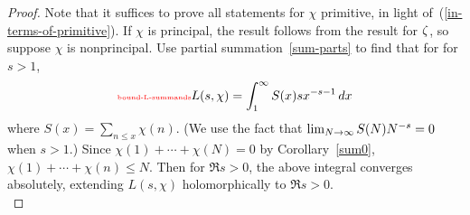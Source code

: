 \begin{proof}
%
Note that it suffices to prove all statements for $\chi$ primitive, in light of~(\ref{in-terms-of-primitive}). If $\chi$ is principal, the result follows from the result for $\zeta$, so suppose $\chi$ is nonprincipal. Use partial summation~\ref{sum-parts} to find that for for $s>1$,
\begin{equation}\llabel{bound-L-summands}
L(s,\chi)=\int_1^{\iy} S(x) sx^{-s-1}\,dx
\end{equation}
where $S(x)=\sum_{n\le x}\chi(n)$.
(We use the fact that $\lim_{N\to \infty}S(N)N^{-s}=0$ when $s>1$.) 
Since $\chi(1)+\cdots +\chi(N)=0$ by Corollary~\ref{sum0}, $\chi(1)+\cdots+\chi(n)\le N$. Then for $\Re s>0$, the above integral converges absolutely, extending $L(s,\chi)$ holomorphically to $\Re s>0$.\\
%


\end{proof}
